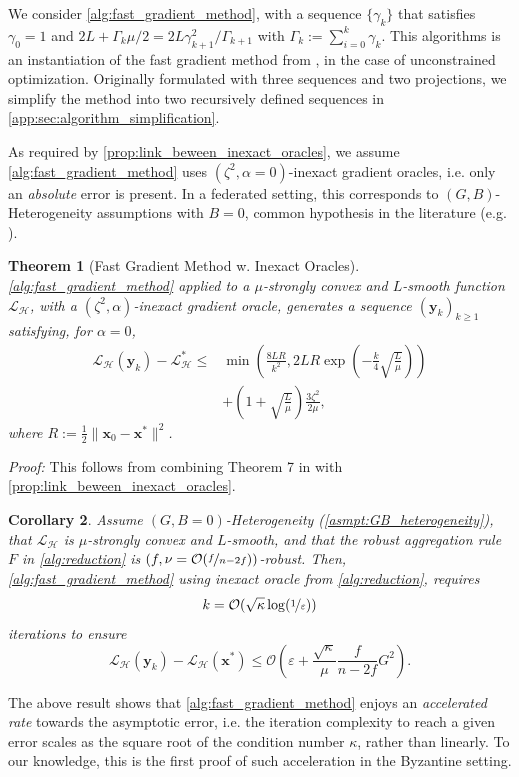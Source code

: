 \documentclass{article}
\def\eps{{\varepsilon}}
\def\vx{{\bm{x}}}
\def\vy{{\bm{y}}}
\newcommand{\cH}{\mathcal{H}}
\newcommand{\cL}{\mathcal{L}}
\newcommand{\cO}{\mathcal{O}}
\theoremstyle{plain}
\newtheorem{theorem}{Theorem}[section]
\newtheorem{corollary}[theorem]{Corollary}
\theoremstyle{definition}
\theoremstyle{remark}
\begin{document}
We consider \cref{alg:fast_gradient_method}, with a sequence $\{\gamma_k\}$ that satisfies $\gamma_0 = 1$ and  $2L+\Gamma_k\mu/2 = 2L\gamma_{k+1}^2/\Gamma_{k+1}$ with $\Gamma_k:= \sum_{i=0}^k \gamma_k$. This algorithms is an instantiation of the fast gradient method from \citep{devolder2014first}, in the case of unconstrained optimization. Originally formulated with three sequences and two projections, we simplify the method into two recursively defined sequences in \cref{app:sec:algorithm_simplification}.

As required by \cref{prop:link_beween_inexact_oracles}, we assume \cref{alg:fast_gradient_method} uses $(\zeta^2,\alpha=0)$-inexact gradient oracles, i.e. only an \textit{absolute} error is present. In a federated setting, this corresponds to $(G,B)$-Heterogeneity assumptions with $B=0$, common hypothesis in the literature (e.g. \citet{karimireddy2020byzantine}).

\begin{theorem}[Fast Gradient Method w. Inexact Oracles]
\label{thm:NAG_Inexact_Oracles}
    \cref{alg:fast_gradient_method} applied to a $\mu$-strongly convex and $L$-smooth function $\cL_{\cH}$, with a $(\zeta^2,\alpha)$-inexact gradient oracle, generates a sequence $(\vy_k)_{k\ge 1}$ satisfying, for $\alpha = 0$,
    \begin{align*}
    \cL_{\cH}(\vy_k) - \cL_{\cH}^* \le &\min\left(\frac{8LR}{k^2}, 2LR\exp\left(-\frac{k}{4}\sqrt{ \frac{L}{\mu} }\right)\right)\\ 
    &+ \left(1 + \sqrt{\frac{L}{\mu}}\right)\frac{3\zeta^2}{2\mu},
    \end{align*}
    where $R := \frac{1}{2}\|\vx_0 - \vx^*\|^2$.
\end{theorem}
\textit{Proof:} This follows from combining Theorem 7 in \citet{devolder2014first} with \cref{prop:link_beween_inexact_oracles}. 

\begin{corollary}
\label{cor:acceleration}
    Assume $(G,B=0)$-Heterogeneity (\cref{asmpt:GB_heterogeneity}), that $\cL_{\cH}$ is $\mu$-strongly convex and $L$-smooth, and that the robust aggregation rule $F$  in \cref{alg:reduction} is  $(f,\nu=\cO(\nicefrac{f}{n-2f}))$-robust. Then, \cref{alg:fast_gradient_method} using inexact oracle from \cref{alg:reduction}, requires
    $$
    k = \cO(\sqrt{\kappa}\log(\nicefrac{1}{\eps}))
    $$
    iterations to ensure
    \[
    \cL_{\cH}(\vy_k) - \cL_{\cH}(\vx^*) \le \cO\left( \eps + \frac{\sqrt{\kappa}}{\mu}\frac{f}{n-2f}G^2 \right).
    \]
\end{corollary}
The above result shows that \cref{alg:fast_gradient_method} enjoys an \textit{accelerated rate} towards the asymptotic error, i.e. the iteration complexity to reach a given error scales as the square root of the condition number $\kappa$, rather than linearly. To our knowledge, this is the first proof of such acceleration in the Byzantine setting.
\end{document}
